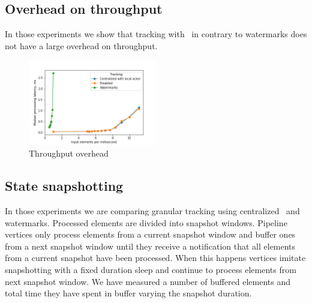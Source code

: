 \subsection{Overhead on throughput}

In those experiments we show that tracking with \tracker\ in contrary to watermarks does not have a large overhead on throughput.

\begin{figure}[htbp]
  \centering
  \includegraphics[width=0.50\textwidth]{pics/throughput_overhead.png}
  \caption{Throughput overhead}
\end{figure}

\subsection{State snapshotting}

In those experiments we are comparing granular tracking using centralized \tracker\ and watermarks. Processed elements are divided into snapshot windows. Pipeline vertices only process elements from a current snapshot window and buffer ones from a next snapshot window until they receive a notification that all elements from a current snapshot have been processed. When this happens vertices imitate snapshotting with a fixed duration sleep and continue to process elements from next snapshot window. We have measured a number of buffered elements and total time they have spent in buffer varying the snapshot duration.


